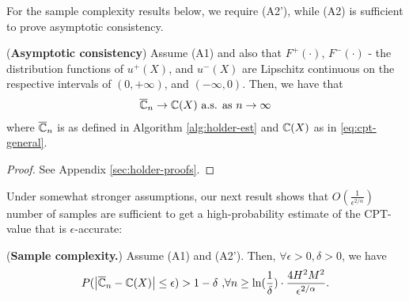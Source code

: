 For the sample complexity results below, we require (A2'), while (A2) is sufficient to prove asymptotic consistency.
\begin{proposition}(\textbf{Asymptotic consistency})
\label{prop:holder-asymptotic}
Assume (A1) and also that $F^+(\cdot)$, $F^-(\cdot)$ - the distribution functions of $u^+(X)$, and $u^-(X)$ 
are Lipschitz continuous 
on the respective intervals of $(0,+\infty)$, and 
$(-\infty, 0)$. Then, we have that
\begin{align}
\overline {\mathbb{C}}_n
\rightarrow
\mathbb{C}(X)
 \text{   a.s. as } n\rightarrow \infty
\end{align}
where $\overline {\mathbb{C}}_n$ is as defined in Algorithm \ref{alg:holder-est} and $\mathbb{C}(X)$ as in \eqref{eq:cpt-general}.
\end{proposition}
\begin{proof}
See Appendix \ref{sec:holder-proofs}. 
\end{proof}
Under somewhat stronger assumptions, 
our next result shows that $O\left(\frac{1}{\epsilon^{2/\alpha}}\right)$ number of samples are sufficient to get a
high-probability estimate of the CPT-value that is $\epsilon$-accurate:
\begin{proposition}(\textbf{Sample complexity.})
\label{prop:holder-dkw}
Assume (A1) and (A2'). Then, $\forall \epsilon >0, \delta >0$, we have
$$
P(\left |\overline {\mathbb{C}}_n- \mathbb{C}(X) \right| \leq  \epsilon ) >1- \delta\text{     ,} \forall n \geq \ln(\frac{1}{\delta})\cdot 
\frac{4H^2 M^2}{\epsilon^{2/\alpha}}.$$
\end{proposition}
